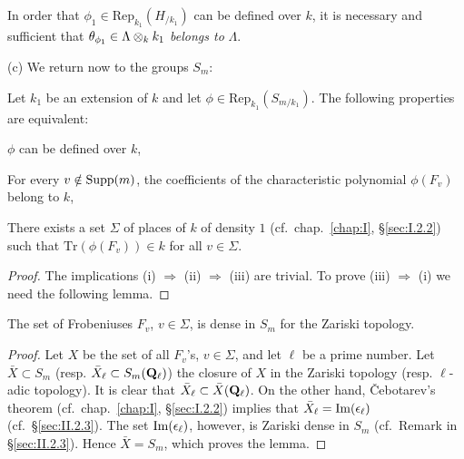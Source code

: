 \begin{corollary}
In order that $\phi_1 \in \mathrm{Rep}_{k_1}(H_{/k_1})$ can be defined
over $k$, it is necessary and sufficient that
$\theta_{\phi_1} \in \Lambda \mathbin{\otimes}_k k_1$ \emph{belongs to} $\Lambda$.
\end{corollary}

(c) We return now to the groups $S_m$:

\begin{proposition}[2]\label{prop:II.2.4.2}
Let $k_1$ be an extension of $k$ and let
$\phi \in \mathrm{Rep}_{k_1}(S_{m/k_1})$.  The following properties are
equivalent:
\begin{rlist}
\item $\phi$ can be defined over $k$,
\item For every $v \notin \mathrm{Supp}(m)$, the coefficients of the
characteristic polynomial $\phi(F_v)$ belong to $k$,
\item There exists a set $\Sigma$ of places of $k$ of density $1$
(cf.~chap.~\ref{chap:I}, \S\ref{sec:I.2.2}) such that
$\mathrm{Tr}(\phi(F_v)) \in k$ for all $v \in \Sigma$.
\end{rlist}
\end{proposition}

\begin{proof}
The implications (i) $\Rightarrow$ (ii) $\Rightarrow$ (iii) are trivial.
To prove (iii) $\Rightarrow$ (i) we need the following lemma.
\end{proof}

\begin{lemma}
The set of Frobeniuses $F_v$, $v \in \Sigma$, is dense in $S_m$ for the
Zariski topology.
\end{lemma}

\begin{proof}
Let $X$ be the set of all $F_v$'s, $v \in \Sigma$, and let $\ell$ be a
prime number.  Let $\bar{X} \subset S_m$ (resp.  $\bar{X}_\ell \subset
S_m(\mathbf{Q}_\ell)$) the closure of $X$ in the Zariski topology (resp.
$\ell$-adic topology).  It is clear that
$\bar{X}_\ell \subset \bar{X}(\mathbf{Q}_\ell)$.  On the other hand,
\v{C}ebotarev's theorem (cf.~chap.~\ref{chap:I}, \S\ref{sec:I.2.2})
implies that $\bar{X}_\ell = \mathrm{Im}(\epsilon_\ell)$
(cf.~\S\ref{sec:II.2.3}).  The set $\mathrm{Im}(\epsilon_\ell)$, however, is
Zariski dense in $S_m$ (cf.~Remark in \S\ref{sec:II.2.3}).  Hence
$\bar{X} = S_m$, which proves the lemma.
\end{proof}

